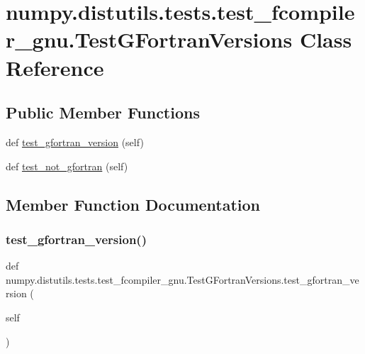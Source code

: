 \hypertarget{classnumpy_1_1distutils_1_1tests_1_1test__fcompiler__gnu_1_1TestGFortranVersions}{}\section{numpy.\+distutils.\+tests.\+test\+\_\+fcompiler\+\_\+gnu.\+Test\+G\+Fortran\+Versions Class Reference}
\label{classnumpy_1_1distutils_1_1tests_1_1test__fcompiler__gnu_1_1TestGFortranVersions}
\subsection*{Public Member Functions}
\begin{DoxyCompactItemize}
\item 
def \hyperlink{classnumpy_1_1distutils_1_1tests_1_1test__fcompiler__gnu_1_1TestGFortranVersions_a355b5eed83557ce154f407abe70ccb6a}{test\+\_\+gfortran\+\_\+version} (self)
\item 
def \hyperlink{classnumpy_1_1distutils_1_1tests_1_1test__fcompiler__gnu_1_1TestGFortranVersions_a974e3f0ea715847015bc3975791f192c}{test\+\_\+not\+\_\+gfortran} (self)
\end{DoxyCompactItemize}


\subsection{Member Function Documentation}
\mbox{\label{classnumpy_1_1distutils_1_1tests_1_1test__fcompiler__gnu_1_1TestGFortranVersions_a355b5eed83557ce154f407abe70ccb6a}} 
\subsubsection{\texorpdfstring{test\+\_\+gfortran\+\_\+version()}{test\_gfortran\_version()}}
{\footnotesize\ttfamily def numpy.\+distutils.\+tests.\+test\+\_\+fcompiler\+\_\+gnu.\+Test\+G\+Fortran\+Versions.\+test\+\_\+gfortran\+\_\+version (\begin{DoxyParamCaption}\item[{}]{self }\end{DoxyParamCaption})}

